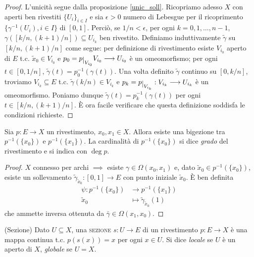 \begin{proof}
  L'unicità segue dalla proposizione \ref{unic_soll}. Ricopriamo adesso $X$ con aperti ben rivestiti $\{U_i\}_{i \in I}$ e sia $\epsilon>0$ numero di Lebesgue per il ricoprimento $\{\gamma^{-1}(U_i), i \in I\}$ di $[0, 1]$.
  Perciò, se $1/n < \epsilon$, per ogni $k=0, 1, \dots, n-1$, $\gamma([k/n, (k+1)/n]) \subseteq U_{i_k}$ ben rivestito.
  Definiamo induttivamente $\tilde{\gamma}$ su $[k/n, (k+1)/n]$ come segue: per definizione di rivestimento esiste $V_{i_0}$ aperto di $E$ t.c. $\tilde{x}_0 \in V_{i_0}$ e $p_0=p \restrict{V_{i_0}} V_{i_0} \longrightarrow U_{i_0}$ è un omeomorfismo;
  per ogni $t \in [0, 1/n]$, $\tilde{\gamma}(t)=p_0^{-1}(\gamma(t))$. Una volta definito $\tilde{\gamma}$ continuo su $[0, k/n]$, troviamo $V_{i_k} \subseteq E$ t.c. $\tilde{\gamma}(k/n) \in V_{i_k}$ e $p_k=p \restrict{V_{i_k}}: V_{i_k} \longrightarrow U_{i_k}$ è un omeomorfismo.
  Poniamo dunque $\tilde{\gamma}(t)=p_k^{-1}(\gamma(t))$ per ogni $t \in [k/n, (k+1)/n]$. È ora facile verificare che questa definizione soddisfa le condizioni richieste.
\end{proof}

\begin{prop}
  Sia $p:E \longrightarrow X$ un rivestimento, $x_0, x_1 \in X$. Allora esiste una bigezione tra $p^{-1}(\{x_0\})$ e $p^{-1}(\{x_1\})$. La cardinalità di $p^{-1}(\{x_0\})$ si dice \textit{grado} del rivestimento e si indica con $\deg{p}$.
\end{prop}

\begin{proof}
  $X$ connesso per archi $\implies$ esiste $\gamma \in \Omega(x_0, x_1)$ e, dato $\tilde{x}_0 \in p^{-1}(\{x_0\})$, esiste un sollevamento $\tilde{\gamma}_{\tilde{x}_0}: [0, 1] \longrightarrow E$ con punto iniziale $\tilde{x}_0$. È ben definita
  \begin{align*}
  \psi:p^{-1}(\{x_0\}) &\longrightarrow p^{-1}(\{x_1\}) \\
  \tilde{x}_0 &\longmapsto \tilde{\gamma}_{\tilde{x}_0}(1)
  \end{align*}
  che ammette inversa ottenuta da $\bar{\gamma} \in \Omega(x_1, x_0)$.
\end{proof}

\begin{defn}
  (Sezione) Dato $U \subseteq X$, una \textsc{sezione} $s:U \longrightarrow E$ di un rivestimento $p:E \longrightarrow X$ è una mappa continua t.c. $p(s(x))=x$ per ogni $x \in U$. Si dice \textit{locale} se $U$ è un aperto di $X$, \textit{globale} se $U=X$.
\end{defn}

